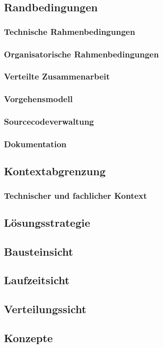 \documentclass[12pt,a4paper,bibliography=totocnumbered,listof=totocnumbered]{scrartcl}
\begin{document}
\subsection{Randbedingungen}
\subsubsection{Technische Rahmenbedingungen}
\subsubsection{Organisatorische Rahmenbedingungen}
\subsubsection{Verteilte Zusammenarbeit}
\subsubsection{Vorgehensmodell}
\subsubsection{Sourcecodeverwaltung}
\subsubsection{Dokumentation}
\subsection{Kontextabgrenzung}
\subsubsection{Technischer und fachlicher Kontext}
\subsection{Lösungsstrategie}
\subsection{Bausteinsicht}
\subsection{Laufzeitsicht}
\subsection{Verteilungssicht}
\subsection{Konzepte}
\end{document}
